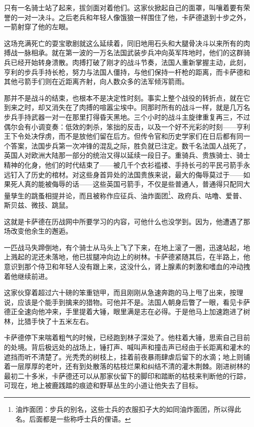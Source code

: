 \documentclass[AutoFakeBold=true]{book}
\begin{document}
只有一名骑士站了起来，拔剑面对着他们。这家伙掀起自己的面罩，叫嚷着要有荣誉的一对一决斗。之后老兵和年轻人像饿狼一样围住了他，卡萨德退到十步之外，一箭射穿了他的左眼。

这场充满死亡的耍宝歌剧就这么延续着，同旧地用石头和大腿骨决斗以来所有的肉搏战一脉相承。就在第一波的一万名法国武装步兵冲向英军阵地时，他们的这群骑兵已经开始转身溃散。肉搏打破了刚才的战斗节奏，法国人重新掌握主动，此刻，亨利的步兵手持长枪，努力与法国人僵持，与他们保持一杆枪的距离，而卡萨德和其他弓箭手们则在近距离齐射，向人数众多的法军倾泻箭雨。

那并不是战斗的结束，也根本不是决定性时刻。事实上整个战役的转折点，就在它到来之时，却又消失在了肉搏的喧嚣尘埃中。同那时所有的战斗一样，就是几万名步兵手持武器一对一在那里打得昏天黑地。三个小时的战斗主旋律重复再三，不过偶尔会有小调变奏：低效的刺杀，笨拙的反击，以及一个好不光彩的时刻——亨利王下令处决俘虏，而不是放他们留在后方。但传令官和历史学家们在日后都有同一个答案，法国步兵第一次冲锋的混乱之际，胜负就已注定。数千名法国人战死了，英国人对欧洲大陆那一部分的统治又得以延续一段日子。重骑兵、贵族骑士、骑士精神的化身，他们的时代结束了——被几千个衣衫褴褛、手持长弓的平民弓箭手永远钉入了历史的棺材。对这些身首异处的法国贵族来说，最大的侮辱莫过于——如果死人真的能被侮辱的话——这些英国弓箭手，不仅是些普通人，普通得只配同大量孳生的跳蚤相提并论，而且被称作应征兵、油炸面团\footnote{油炸面团：步兵的别名，这些士兵的衣服扣子大的如同油炸面团，所以得此名。后面都是一些称呼士兵的俚语。}、政府兵、咕噜、爱普、斯贝兹、微技、跳鼠。

这就是卡萨德在历战网中所要学习的内容，可他什么也没学到。因为，他遭遇了那场改变他余生的邂逅。

\vspace*{1em}

一匹战马失蹄倒地，有个骑士从马头上飞了下来，在地上滚了一圈，迅速站起，地上溅起的泥还未落地，他已拔腿冲向边上的树林。卡萨德紧随其后，在半路上，他意识到那个侍卫和年轻人没有跟上来，这没什么，肾上腺素的刺激和嗜血的冲动拽着他继续前进。

这家伙穿着超过六十磅的笨重铠甲，而且刚刚从急速奔跑的马上甩了出来，按理说，应该是个能手到擒来的猎物。可他并不是。法国人朝身后瞥了一眼，看见卡萨德正全速向他冲来，手里提着大锤，眼里满是志在必得。于是他马上加速跑进了树林，比猎手快了十五米左右。

卡萨德停下来喘着粗气的时候，已经跑到林子深处了。他柱着大锤，思索自己目前的处境。背后极远处的战场上，锤打声、喊叫声和撞击声已经由于长距离和灌木的遮挡而听不清楚了。光秃秃的树枝上，挂着前夜暴雨肆虐后留下的水滴；地上则铺着一层厚厚的老叶，还有到处散落的枯枝烂果和纠结不清的灌木荆棘。刚进树林的最初二十多米，卡萨德还可以从那家伙留下的脚印和踏断的枯枝来判断他的行踪，可现在，地上被鹿践踏的痕迹和野草丛生的小道让他失去了目标。
\end{document}
